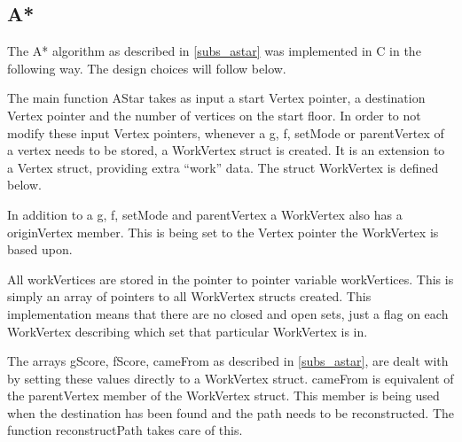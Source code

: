 \subsection{A*}


The A* algorithm as described in \cref{subs_astar} was implemented in C in the following way. The design choices will follow below.



The main function AStar takes as input a start Vertex pointer, a destination Vertex pointer and the number of vertices on the start floor. In order to not modify these input Vertex pointers, whenever a g, f, setMode or parentVertex of a vertex needs to be stored, a WorkVertex struct is created. It is an extension to a Vertex struct, providing extra \enquote{work} data. The struct WorkVertex is defined below.



In addition to a g, f, setMode and parentVertex a WorkVertex also has a originVertex member. This is being set to the Vertex pointer the WorkVertex is based upon. 

All workVertices are stored in the pointer to pointer variable workVertices. This is simply an array of pointers to all WorkVertex structs created. This implementation means that there are no closed and open sets, just a flag on each WorkVertex describing which set that particular WorkVertex is in. 

The arrays gScore, fScore, cameFrom as described in \cref{subs_astar}, are dealt with by setting these values directly to a WorkVertex struct. cameFrom is equivalent of the parentVertex member of the WorkVertex struct. This member is being used when the destination has been found and the path needs to be reconstructed. The function reconstructPath takes care of this.



